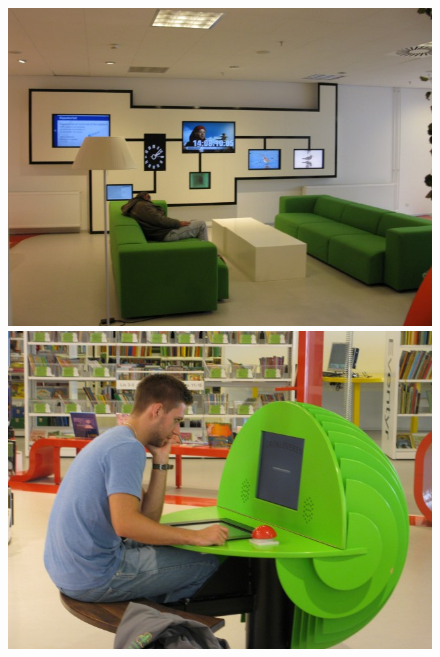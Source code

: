 \begin{figure}[htbp]\centering
	\begin{minipage}[b]{0.3\textwidth}\centering
		\includegraphics[width=1.00\textwidth]{Pictures/HjoerringLibrary/p1.jpg} %
	\end{minipage}\hfill
	\begin{minipage}[b]{0.3\textwidth}\centering
		\includegraphics[width=1.00\textwidth]{Pictures/HjoerringLibrary/p2.jpg} %
	\end{minipage}\hfill	
	\begin{minipage}[b]{0.3\textwidth}\centering

\end{minipage}
\end{figure}
